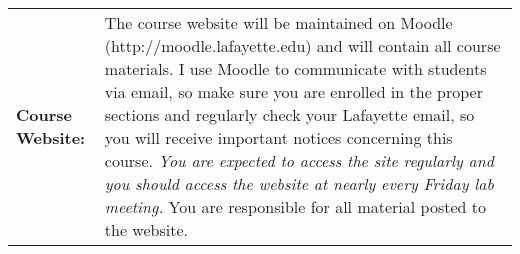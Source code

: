 \documentclass[10pt]{amsart}
\begin{document}
\noindent
\begin{tabular}{p{1.4in}p{5in}}
  {\bf Course Website:} & The course website will be maintained on Moodle (http://moodle.lafayette.edu) and will contain all course materials.  I use Moodle to communicate with students via email, so make sure you are enrolled in the proper sections and regularly check your Lafayette email, so you will receive important notices concerning this course. {\it You are expected to access the site regularly and you should access the website at nearly every Friday lab meeting.}  You are responsible for all material posted to the website.  
  
  
\end{tabular}
\end{document}
